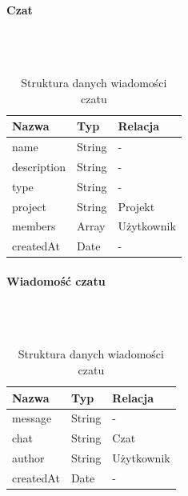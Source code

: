 \documentclass[eng,printmode]{mgr}
\begin{document}
\begin{table}[H]
\centering
\begin{minipage}{.4\textwidth}
\paragraph{Czat} \ \\ \\
\begin{tabular}{|l|l|l|}
  \hline 
  \textbf{Nazwa} & \textbf{Typ} & \textbf{Relacja}\\
  \hline
   name & String & -\\
  \hline
   description & String & -\\
  \hline
   type & String & -\\
  \hline
   project & String & Projekt\\
  \hline
   members & Array & Użytkownik\\
  \hline
   createdAt & Date & -\\
  \hline
\end{tabular} 
\caption{Struktura danych czatu}
\end{minipage}\hfill
\begin{minipage}{.4\textwidth}
\paragraph{Wiadomość czatu} \ \\ \\
\begin{tabular}{|l|l|l|}
  \hline 
  \textbf{Nazwa} & \textbf{Typ} & \textbf{Relacja}\\
  \hline
   message & String & -\\
  \hline
   chat & String & Czat\\
  \hline
   author & String & Użytkownik\\
  \hline
   createdAt & Date & -\\
  \hline
\end{tabular} 
\caption{Struktura danych wiadomości czatu}
\end{minipage}\hfill
\end{table}
\newpage
\end{document}
